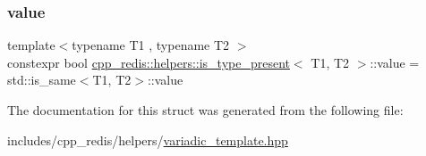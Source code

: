 \subsubsection{\texorpdfstring{value}{value}}
{\footnotesize\ttfamily template$<$typename T1 , typename T2 $>$ \\
constexpr bool \hyperlink{structcpp__redis_1_1helpers_1_1is__type__present}{cpp\+\_\+redis\+::helpers\+::is\+\_\+type\+\_\+present}$<$ T1, T2 $>$\+::value = std\+::is\+\_\+same$<$T1, T2$>$\+::value\hspace{0.3cm}{\ttfamily [static]}}



The documentation for this struct was generated from the following file\+:\begin{DoxyCompactItemize}
\item 
includes/cpp\+\_\+redis/helpers/\hyperlink{variadic__template_8hpp}{variadic\+\_\+template.\+hpp}\end{DoxyCompactItemize}
